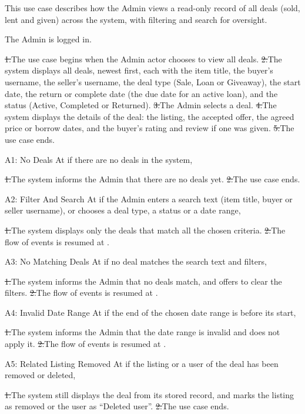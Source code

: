 This use case describes how the Admin views a read-only record of all deals (sold, lent and given) across the system, with filtering and search for oversight.\par
{}
The Admin is logged in.\par
{}
\st{1.}{The use case begins when the Admin actor chooses to view all deals.}
\st{2.}{The system displays all deals, newest first, each with the item title, the buyer's username, the seller's username, the deal type (Sale, Loan or Giveaway), the start date, the return or complete date (the due date for an active loan), and the status (Active, Completed or Returned).}
\st{3.}{The Admin selects a deal.}
\st{4.}{The system displays the details of the deal: the listing, the accepted offer, the agreed price or borrow dates, and the buyer's rating and review if one was given.}
\st{5.}{The use case ends.}
\begin{flowblock}{A1: No Deals}
At  if there are no deals in the system,\par
\st{1.}{The system informs the Admin that there are no deals yet.}
\st{2.}{The use case ends.}
\end{flowblock}
\begin{flowblock}{A2: Filter And Search}
At  if the Admin enters a search text (item title, buyer or seller username), or chooses a deal type, a status or a date range,\par
\st{1.}{The system displays only the deals that match all the chosen criteria.}
\st{2.}{The flow of events is resumed at .}
\end{flowblock}
\begin{flowblock}{A3: No Matching Deals}
At  if no deal matches the search text and filters,\par
\st{1.}{The system informs the Admin that no deals match, and offers to clear the filters.}
\st{2.}{The flow of events is resumed at .}
\end{flowblock}
\begin{flowblock}{A4: Invalid Date Range}
At  if the end of the chosen date range is before its start,\par
\st{1.}{The system informs the Admin that the date range is invalid and does not apply it.}
\st{2.}{The flow of events is resumed at .}
\end{flowblock}
\begin{flowblock}{A5: Related Listing Removed}
At  if the listing or a user of the deal has been removed or deleted,\par
\st{1.}{The system still displays the deal from its stored record, and marks the listing as removed or the user as ``Deleted user''.}
\st{2.}{The use case ends.}
\end{flowblock}

